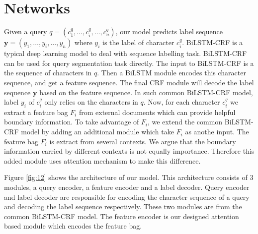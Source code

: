\section{Networks}
\label{sec:methodology}

Given a query $q = (c_1^q, \ldots, c_i^q, \ldots, c_n^q)$, our model predicts label sequence $\bm{y} = (y_1, \ldots, y_i, \ldots, y_n)$ where $y_i$ is the label of character $c_i^q$. BiLSTM-CRF is a typical deep learning model to deal with sequence labelling task. BiLSTM-CRF can be used for query segmentation task directly. The input to BiLSTM-CRF is a the sequence of characters in $q$. Then a BiLSTM module encodes this character sequence, and get a feature sequence. The final CRF module will decode the label sequence $\bm{y}$ based on the feature sequence. In such common BiLSTM-CRF model, label $y_i$ of $c_i^q$ only relies on the characters in $q$. Now, for each character $c_i^q$ we extract a feature bag $F_i$ from external documents which can provide helpful boundary information. To take advantage of $F_i$, we extend the common BiLSTM-CRF model by adding an additional module which take $F_i$ as anothe input. The feature bag $F_i$ is extract from several contexts. We argue that the boundary information carried by different contexts is not equally importance. Therefore this added module uses attention mechanism to make this difference.

Figure \ref{fig:12} shows the architecture of our model. This architecture consists of $3$ modules, a query encoder, a feature encoder and a label decoder. Query encoder and label decoder are responsible for encoding the character sequence of a query and decoding the label sequence respectively. These two modules are from the common BiLSTM-CRF model. The feature encoder is our designed attention based module which encodes the feature bag.

